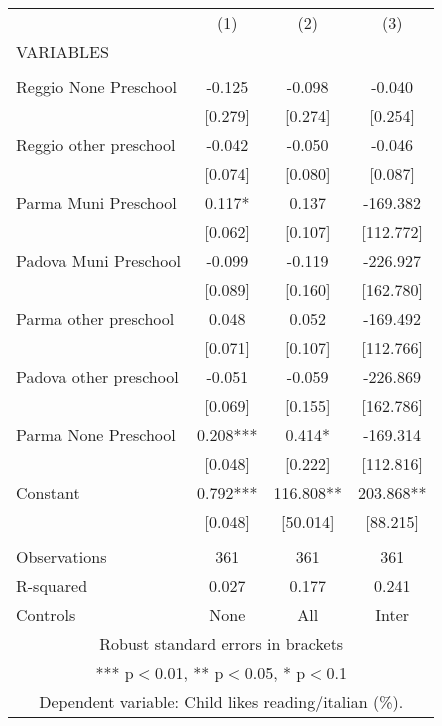 \begin{tabular}{lccc} \hline
 & (1) & (2) & (3) \\
VARIABLES &  &  &  \\ \hline
 &  &  &  \\
Reggio None Preschool & -0.125 & -0.098 & -0.040 \\
 & [0.279] & [0.274] & [0.254] \\
Reggio other preschool & -0.042 & -0.050 & -0.046 \\
 & [0.074] & [0.080] & [0.087] \\
Parma Muni Preschool & 0.117* & 0.137 & -169.382 \\
 & [0.062] & [0.107] & [112.772] \\
Padova Muni Preschool & -0.099 & -0.119 & -226.927 \\
 & [0.089] & [0.160] & [162.780] \\
Parma other preschool & 0.048 & 0.052 & -169.492 \\
 & [0.071] & [0.107] & [112.766] \\
Padova other preschool & -0.051 & -0.059 & -226.869 \\
 & [0.069] & [0.155] & [162.786] \\
Parma None Preschool & 0.208*** & 0.414* & -169.314 \\
 & [0.048] & [0.222] & [112.816] \\
Constant & 0.792*** & 116.808** & 203.868** \\
 & [0.048] & [50.014] & [88.215] \\
 &  &  &  \\
Observations & 361 & 361 & 361 \\
R-squared & 0.027 & 0.177 & 0.241 \\
 Controls & None & All & Inter \\ \hline
\multicolumn{4}{c}{ Robust standard errors in brackets} \\
\multicolumn{4}{c}{ *** p$<$0.01, ** p$<$0.05, * p$<$0.1} \\
\multicolumn{4}{c}{ Dependent variable: Child likes reading/italian (\%).} \\
\end{tabular}
